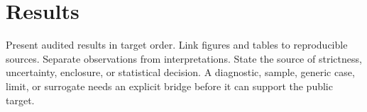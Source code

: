 \section{Results}

Present audited results in target order. Link figures and tables to reproducible
sources. Separate observations from interpretations. State the source of
strictness, uncertainty, enclosure, or statistical decision. A diagnostic,
sample, generic case, limit, or surrogate needs an explicit bridge before it can
support the public target.
